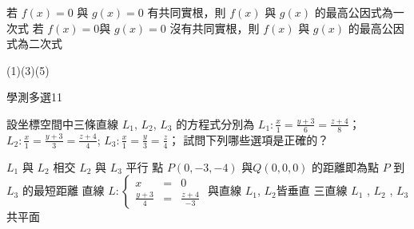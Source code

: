 \begin{QUESTIONS}
\begin{QUESTION}
\begin{QBODY}
\begin{QOPS}
				\QOP 若 $f(x)=0$ 與 $g(x)=0$ 有共同實根，則 $f(x)$ 與 $g(x)$ 的最高公因式為一次式 
				\QOP 若 $f(x)=0$與 $g(x)=0$ 沒有共同實根，則 $f(x)$ 與 $g(x)$ 的最高公因式為二次式
			\end{QOPS}
        \end{QBODY}
        \begin{QFROMS}
        \end{QFROMS}
        \begin{QTAGS}\end{QTAGS}
        \begin{QANS}
            (1)(3)(5)
        \end{QANS}
        \begin{QSOLLIST}
        \end{QSOLLIST}
        \begin{QEMPTYSPACE}
        \end{QEMPTYSPACE}
    \end{QUESTION}
    \begin{QUESTION}
        \begin{ExamInfo}{97}{學測}{多選}{11}
        \end{ExamInfo}
        \begin{ExamAnsRateInfo}{27}{51}{19}{11}
        \end{ExamAnsRateInfo}
        \begin{QBODY}
            設坐標空間中三條直線 $L_1$, $L_2$, $L_3$ 的方程式分別為 $L_1: \frac{x}{1} = \frac{y+3}{6} = \frac{z+4}{8}$；$L_2: \frac{x}{1} = \frac{y+3}{3} = \frac{z+4}{4}$; $L_3: \frac{x}{1} = \frac{y}{3} = \frac{z}{4}$；
			試問下列哪些選項是正確的？
			\begin{QOPS} 
				\QOP $L_1$ 與 $L_2$ 相交 
				\QOP $L_2$ 與 $L_3$ 平行 
				\QOP 點 $P(0,-3,-4)$ 與$Q(0,0,0)$ 的距離即為點 $P$ 到 $L_3$ 的最短距離 
				\QOP 直線 $L: \left\{ \begin{array}{rcl} x & = & 0 \\ \frac{y+3}{4} &=& \frac{z+4}{-3} \end{array} \right.$ 與直線 $L_{1}$, $L_{2}$皆垂直
				\QOP 三直線 $L_1$ , $L_2$ , $L_3$ 共平面 
			\end{QOPS}
        \end{QBODY}
        \begin{QFROMS}
        \end{QFROMS}
        \begin{QTAGS}\end{QTAGS}

\end{QUESTION}
\end{QUESTIONS}
